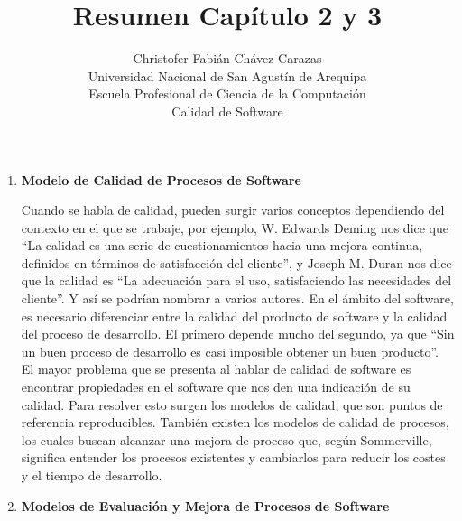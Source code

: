 \documentclass[a4paper,12pt]{article}
\begin{document}
\title{Resumen Capítulo 2 y 3}
\author{
Christofer Fabián Chávez Carazas \\
\small{Universidad Nacional de San Agustín de Arequipa} \\
\small{Escuela Profesional de Ciencia de la Computación} \\
\small{Calidad de Software}
}
\date{}

\maketitle

\begin{enumerate}
 \item \textbf{Modelo de Calidad de Procesos de Software}
 
 Cuando se habla de calidad, pueden surgir varios conceptos dependiendo del contexto en el que se trabaje, por ejemplo, W. Edwards Deming
 nos dice que ``La calidad es una serie de cuestionamientos hacia una mejora continua, definidos en términos de satisfacción del cliente'', y
 Joseph M. Duran nos dice que la calidad es ``La adecuación para el uso, satisfaciendo las necesidades del cliente''. Y así se podrían nombrar a varios
 autores. En el ámbito del software, es necesario diferenciar entre la calidad del producto de software y la calidad del proceso de desarrollo.
 El primero depende mucho del segundo, ya que ``Sin un buen proceso de desarrollo es casi imposible obtener un buen producto''. \\
 El mayor problema que se presenta al hablar de calidad de software es encontrar propiedades en el software que nos den una indicación de su calidad.
 Para resolver esto surgen los modelos de calidad, que son puntos de referencia reproducibles. También existen los modelos de calidad de procesos, los cuales
 buscan alcanzar una mejora de proceso que, según Sommerville, significa entender los procesos existentes y cambiarlos para reducir los costes y el tiempo
 de desarrollo.
 
 \item \textbf{Modelos de Evaluación y Mejora de Procesos de Software}
  

\end{enumerate}
\end{document}
